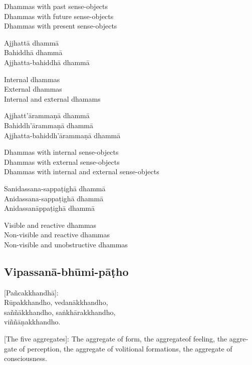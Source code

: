\begin{english}
  Dhammas with past sense-objects\\
  Dhammas with future sense-objects\\
  Dhammas with present sense-objects
\end{english}

Ajjhattā dhammā\\
Bahiddhā dhammā\\
Ajjhatta-bahiddhā dhammā

\begin{english}
  Internal dhammas\\
  External dhammas\\
  Internal and external dhamams
\end{english}

Ajjhatt'ārammaṇā dhammā\\
Bahiddh'ārammaṇā dhammā\\
Ajjhatta-bahiddh'ārammaṇā dhammā

\begin{english}
  Dhammas with internal sense-objects\\
  Dhammas with external sense-objects\\
  Dhammas with internal and external sense-objects
\end{english}

Sanidassana-sappaṭighā dhammā\\
Anidassana-sappaṭighā dhammā\\
Anidassanāppaṭighā dhammā

\begin{english}
  Visible and reactive dhammas\\
  Non-visible and reactive dhammas\\
  Non-visible and unobstructive dhammas
\end{english}

\suttaRef{[Dhs 1]}

\subsection{Vipassanā-bhūmi-pāṭho}
\label{vipassana-bhumi-patho}
[Pañcakkhandhā]:\\
Rūpakkhandho, vedanākkhandho,\\
saññākkhandho, saṅkhārakkhandho,\\
viññāṇakkhandho.

\begin{english}
  [The five aggregates]: The aggregate of form, the aggregateof feeling, the aggregate of perception, the aggregate of volitional formations, the aggregate of consciousness.
\end{english}

